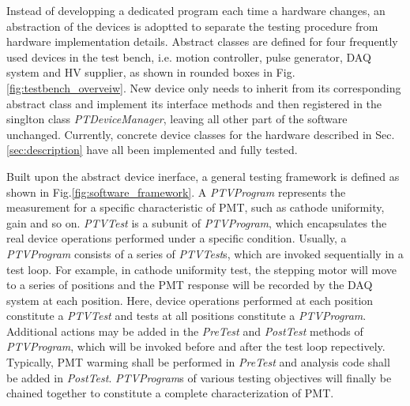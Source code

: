 \documentclass[5p, times]{elsarticle}
\begin{document}
Instead of developping a dedicated program each time a hardware changes, an abstraction of the devices is adoptted to separate the testing procedure from hardware implementation details. 
Abstract classes are defined for four frequently used devices in the test bench, i.e. motion controller, pulse generator, DAQ system and HV supplier, as shown in rounded boxes in Fig.\ref{fig:testbench_overveiw}.
New device only needs to inherit from its corresponding abstract class and implement its interface methods and then registered in the singlton class \textit{PTDeviceManager}, leaving all other part of the software unchanged.
Currently, concrete device classes for the hardware described in Sec.\ref{sec:description} have all been implemented and fully tested.

Built upon the abstract device inerface, a general testing framework is defined as shown in Fig.\ref{fig:software_framework}.
A \textit{PTVProgram} represents the measurement for a specific characteristic of PMT, such as cathode uniformity, gain and so on.
\textit{PTVTest} is a subunit of \textit{PTVProgram}, which encapsulates the real device operations performed under a specific condition.
Usually, a \textit{PTVProgram} consists of a series of \textit{PTVTest}s, which are invoked sequentially in a test loop.
For example, in cathode uniformity test, the stepping motor will move to a series of positions and the PMT response will be recorded by the DAQ system at each position.
Here, device operations performed at each position constitute a \textit{PTVTest} and tests at all positions constitute a \textit{PTVProgram}.
Additional actions may be added in the \textit{PreTest} and \textit{PostTest} methods of \textit{PTVProgram}, which will be invoked before and after the test loop repectively.
Typically, PMT warming shall be performed in \textit{PreTest} and analysis code shall be added in \textit{PostTest}.
\textit{PTVProgram}s of various testing objectives will finally be chained together to constitute a complete characterization of PMT.
\end{document}
